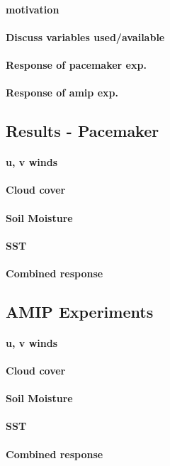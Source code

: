 \paragraph{motivation}
\paragraph{Discuss variables used/available}
\paragraph{Response of pacemaker exp.}
\paragraph{Response of amip exp.}


\subsection{Results - Pacemaker}
\paragraph{u, v winds}
\paragraph{Cloud cover}
\paragraph{Soil Moisture}
\paragraph{SST}
\paragraph{Combined response}


\subsection{AMIP Experiments}

\paragraph{u, v winds}
\paragraph{Cloud cover}
\paragraph{Soil Moisture}
\paragraph{SST}
\paragraph{Combined response}